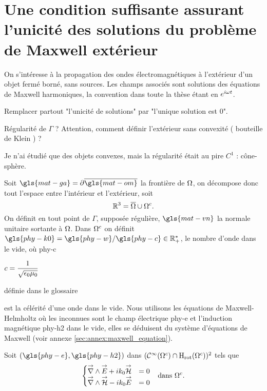 \section[Une CSU des solutions du problème de Maxwell extérieur]{Une condition suffisante assurant l'unicité des solutions du problème de Maxwell extérieur}

  On s’intéresse à la propagation des ondes électromagnétiques à l'extérieur d'un objet fermé borné, sans sources. Les champs associés sont solutions des équations de Maxwell harmoniques, la convention dans toute la thèse étant en \(e^{i\omega t}\). 

  \begin{REM}
    Remplacer partout "l'unicité de solutions" par "l'unique solution est 0".
  \end{REM}

  \begin{REM}
      Régularité de \(\Gamma\) ? Attention, comment définir l'extérieur sans convexité ( bouteille de Klein ) ?
  \end{REM}
  \begin{REP}
      Je n'ai étudié que des objets convexes, mais la régularité était au pire \(C^1\) : cône-sphère.
  \end{REP}
  Soit \(\gls{mat-ga}=\partial\overline{\gls{mat-om}}\) la frontière de \(\Omega\), on décompose donc tout l'espace entre l'intérieur et l'extérieur, soit 
  \[
    \mathbb R^3 = \overline{\Omega}\cup{\Omega}^c.
  \]
  On définit en tout point de \(\Gamma\), supposée régulière, \(\gls{mat-vn}\) la normale unitaire sortante à \(\Omega\).
  Dans \(\Omega^c\) on définit \(\gls{phy-k0}=\gls{phy-w} / \gls{phy-c} \in \RR_+^*\), le nombre d'onde dans le vide, où \gls{phy-c} 
  \begin{REM} 
      \(c=\dfrac{1}{\sqrt{\epsilon_0\mu_0}}\)
  \end{REM}
  \begin{REP}
    définie dans le glossaire 
  \end{REP}
  est la célérité d'une onde dans le vide.
  Nous utilisons les équations de Maxwell-Helmholtz où les inconnues sont le champ électrique \gls{phy-e} et l'induction magnétique \gls{phy-h2} dans le vide, elles se déduisent du système d'équations de Maxwell (voir annexe \ref{sec:annex:maxwell_equation}). 

  Soit \((\gls{phy-e},\gls{phy-h2})\) dans \((\mathcal{C}^\infty(\Omega^c)\cap\mathrm{H}_\mathrm{rot}(\Omega^c))^2\) tels que
  \begin{align}
  \left\lbrace
    \begin{matrix}
      {\overset{\rightarrow}{\nabla}}\wedge {\overset{\rightarrow}{E}} + i k_0 {\overset{\rightarrow}{\mathcal{H}}} &= 0
      \\
      {\overset{\rightarrow}{\nabla}}\wedge {\overset{\rightarrow}{\mathcal{H}}} - i k_0 {\overset{\rightarrow}{E}} &= 0
    \end{matrix}
    \right. && \text{dans \(\Omega^c\).}
    \label{eq:unicite:maxwell_ext}
  \end{align}

